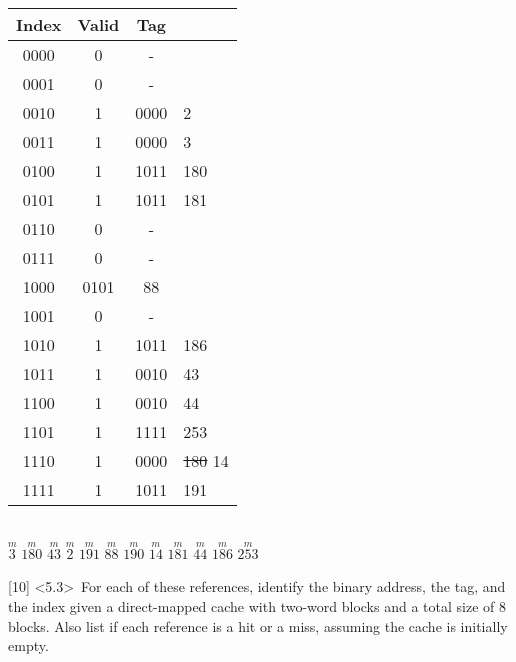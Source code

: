 \documentclass[12pt]{article}
\begin{document}
	\begin{center}
		\begin{tabular}{ |c|c|c|l| } 
			\hline
			Index & Valid & Tag &  \\
			\hline
			0000 & 0 & - & \\
			\hline
			0001 & 0 & - & \\
			\hline
			0010 & 1 & 0000 & 2 \\
			\hline
			0011 & 1 & 0000 & 3\\
			\hline
			0100 & 1 & 1011 & 180\\
			\hline
			0101 & 1 & 1011 & 181 \\
			\hline
			0110 & 0 & - & \\
			\hline
			0111 & 0 & - & \\
			\hline
			1000 & 0101 & 88 & \\
			\hline
			1001 & 0 & - & \\
			\hline
			1010 & 1 & 1011 & 186\\
			\hline
			1011 & 1 & 0010 & 43\\
			\hline
			1100 & 1 & 0010 & 44\\
			\hline
			1101 & 1 & 1111 & 253\\
			\hline
			1110 & 1 & 0000 & \sout{180} 14 \\
			\hline
			1111 & 1 & 1011 & 191 \\
			\hline
			
		\end{tabular}
		\vspace{0.3cm} \\

		$\overset{m}{3}$ $\overset{m}{180}$ $\overset{m}{43}$ $\overset{m}{2}$ $\overset{m}{191}$ $\overset{m}{88}$ $\overset{m}{190}$ $\overset{m}{14}$ $\overset{m}{181}$ $\overset{m}{44}$ $\overset{m}{186}$ $\overset{m}{253}$  \\
		
	\end{center}
	
	\newpage
	
	\noindent {} 
	[10] \textless5.3\textgreater \ For each of these references, identify the binary address, the tag,
	and the index given a direct-mapped cache with two-word blocks and a total size of 8
	blocks. Also list if each reference is a hit or a miss, assuming the cache is initially empty. \\
	
\end{document}

